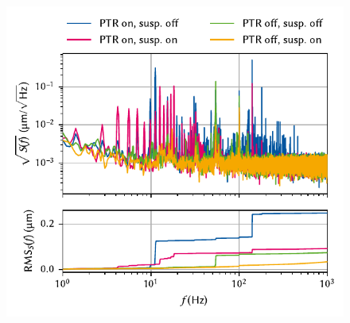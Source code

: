 \begin{figure}
    \centering
    \includegraphics{img/pdf/setup/spect_optic}
    \caption[]{}
    \label{fig:}
\end{figure}
